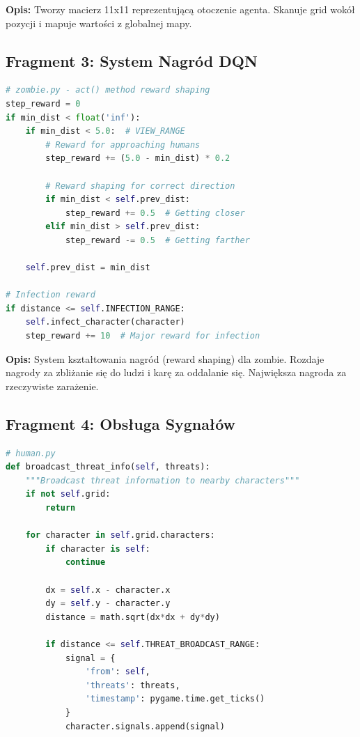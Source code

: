 \documentclass[12pt,a4paper]{article}
\begin{document}
\textbf{Opis:} Tworzy macierz 11x11 reprezentującą otoczenie agenta. Skanuje grid wokół pozycji i mapuje wartości z globalnej mapy.

\subsection{Fragment 3: System Nagród DQN}

\begin{lstlisting}[language=Python]
# zombie.py - act() method reward shaping
step_reward = 0
if min_dist < float('inf'):
    if min_dist < 5.0:  # VIEW_RANGE
        # Reward for approaching humans
        step_reward += (5.0 - min_dist) * 0.2
        
        # Reward shaping for correct direction
        if min_dist < self.prev_dist:
            step_reward += 0.5  # Getting closer
        elif min_dist > self.prev_dist:
            step_reward -= 0.5  # Getting farther
    
    self.prev_dist = min_dist

# Infection reward
if distance <= self.INFECTION_RANGE:
    self.infect_character(character)
    step_reward += 10  # Major reward for infection
	\end{lstlisting}

\textbf{Opis:} System kształtowania nagród (reward shaping) dla zombie. Rozdaje nagrody za zbliżanie się do ludzi i karę za oddalanie się. Największa nagroda za rzeczywiste zarażenie.

\subsection{Fragment 4: Obsługa Sygnałów}

\begin{lstlisting}[language=Python]
# human.py
def broadcast_threat_info(self, threats):
    """Broadcast threat information to nearby characters"""
    if not self.grid:
        return
    
    for character in self.grid.characters:
        if character is self:
            continue
        
        dx = self.x - character.x
        dy = self.y - character.y
        distance = math.sqrt(dx*dx + dy*dy)
        
        if distance <= self.THREAT_BROADCAST_RANGE:
            signal = {
                'from': self,
                'threats': threats,
                'timestamp': pygame.time.get_ticks()
            }
            character.signals.append(signal)
	\end{lstlisting}
\end{document}
